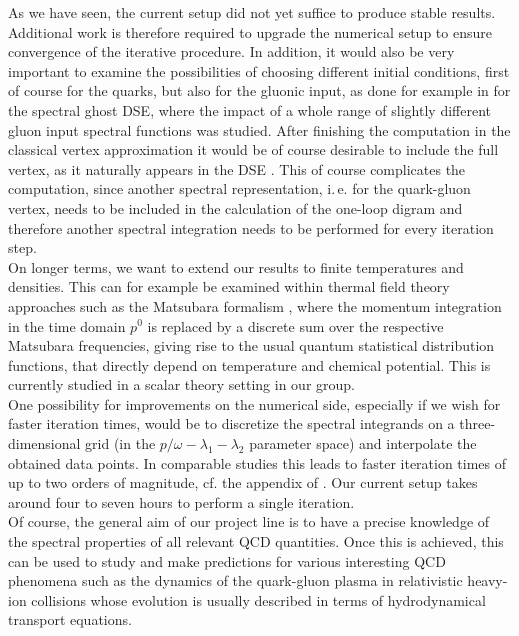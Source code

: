 As we have seen, the current setup did not yet suffice to produce stable results. Additional work is therefore required to upgrade the numerical setup to ensure convergence of the iterative procedure. In addition, it would also be very important to examine the possibilities of choosing different initial conditions, first of course for the quarks, but also for the gluonic input, as done for example in  \cite{HorakPapavassiliouPawlowskiWink2021} for the spectral ghost DSE, where the impact of a whole range of slightly different gluon input spectral functions was studied. 
After finishing the computation in the classical vertex approximation it would be of course desirable to include the full vertex, as it naturally appears in the DSE . This of course complicates the computation, since another spectral representation, i.\,e. for the quark-gluon vertex, needs to be included in the calculation  of the one-loop digram and therefore another spectral integration needs to be performed for every iteration step.  \\ %
On longer terms, we want to extend our results to finite temperatures and densities. This can for example be examined within thermal field theory approaches such as the Matsubara formalism \cite{Matsubara1955}, where the momentum integration in the time  domain $p^0$ is replaced by a discrete sum over the respective Matsubara frequencies, giving rise to the usual quantum statistical distribution functions, that directly depend on temperature and chemical potential. This is currently studied in a scalar theory setting in our group. \\
One possibility for improvements on the numerical side, especially if we wish for faster iteration times, would be to discretize the spectral integrands on a three-dimensional grid (in the $p/\omega-\lambda_1-\lambda_2$ parameter space) and interpolate the obtained data points. In comparable studies this leads to faster iteration times of up to two orders of magnitude, cf. the appendix of \cite{HorakPapavassiliouPawlowskiWink2021}. Our current setup takes around four to seven hours to perform a single iteration.\\
Of course, the general aim of our project line is to have a precise knowledge of the spectral properties of all relevant QCD quantities. Once this is achieved, this  can be used to study and make predictions for various interesting QCD phenomena such as the dynamics of the quark-gluon plasma in relativistic heavy-ion collisions whose evolution is usually described in terms of hydrodynamical transport equations.

\cleardoublepage